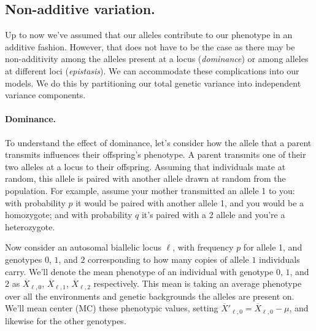 \subsection{Non-additive variation.}
\label{section:nonAddVar}
Up to now we've assumed that our alleles contribute to our phenotype in an
additive fashion. However, that does not have to be the case as there may be
non-additivity among the alleles present at a locus (\emph{dominance}) or among
alleles at different loci (\emph{epistasis}). We can accommodate these complications
into our models. We do this by partitioning our total genetic variance into
independent variance components.



\paragraph{Dominance.} To understand the effect of dominance, let's consider how the allele
that a parent transmits influences their offspring's
phenotype. A parent transmits one of their two alleles at a locus to their offspring. 
Assuming that individuals mate at random, this allele is paired with another allele drawn at random from the population.
For example, assume your mother transmitted an allele 1 to you: with probability $p$ it would be paired with another allele 1, and you would be a homozygote; and with probability $q$ it's paired with a 2 allele and you're a heterozygote.


Now consider an autosomal biallelic locus $\ell$, with frequency $p$ for allele 1, and
genotypes $0$, $1$, and $2$ corresponding to how many copies of allele
$1$ individuals carry. We'll denote the mean phenotype of an individual
with genotype $0$, $1$, and $2$ as $\overline{X}_{\ell,0}$,
$\overline{X}_{\ell,1}$, $\overline{X}_{\ell,2}$ respectively. This mean is
taking an average phenotype over all the environments and genetic backgrounds the alleles
are present on. We'll mean center (MC)
these phenotypic values, setting $\overline{X}'_{\ell,0} = \overline{X}_{\ell,0} - \mu$, and
likewise for the other genotypes. 

